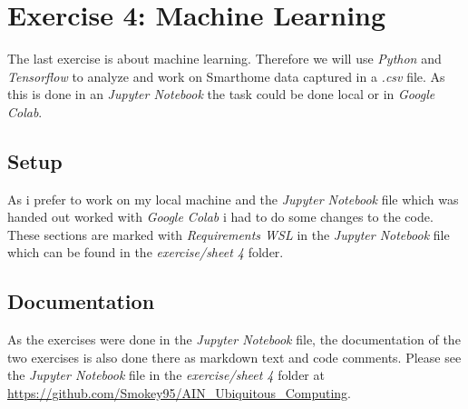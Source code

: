 \section{Exercise 4: Machine Learning}
The last exercise is about machine learning. Therefore we will use \textit{Python} and \textit{Tensorflow} 
to analyze and work on Smarthome data captured in a \textit{.csv} file. 
As this is done in an \textit{Jupyter Notebook} the task could be done local or in \textit{Google Colab}.

\subsection{Setup}
As i prefer to work on my local machine and the \textit{Jupyter Notebook} file which was handed out 
worked with \textit{Google Colab} i had to do some changes to the code.
These sections are marked with \textit{Requirements WSL} in the \textit{Jupyter Notebook} file 
which can be found in the \textit{exercise/sheet 4} folder.

\subsection{Documentation}
As the exercises were done in the \textit{Jupyter Notebook} file, the documentation of the two exercises 
is also done there as markdown text and code comments.
Please see the \textit{Jupyter Notebook} file in the \textit{exercise/sheet 4} folder at 
\url{https://github.com/Smokey95/AIN_Ubiquitous_Computing}.